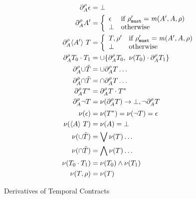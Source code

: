   {\begin{align*}
      \partial_{A}^{\rho}{\epsilon} &= \bot
      \\
      \partial_{A}^{\rho}{A'} &= \left\{
        \begin{array}{ll}
          \epsilon & \text{if } \rho'_{\tt must} = \mathit{m}(A', A, \rho) \\
          \bot & \text{otherwise}
        \end{array}\right.
      \\
      \partial_{A}^{\rho}{\langle A'\rangle\ T} &=
      \left\{\begin{array}{ll}
          T,\rho' & \text{if } \rho'_{\tt must} = \mathit{m}(A', A, \rho) \\
          \bot & \text{otherwise}
        \end{array}\right.
      \\
      \partial_{A}^{\rho}{T_0 \cdot T_1} &=
      \cup \{\partial_{A}^{\rho}{T_0},\
          \nu(T_0) \cdot \partial_{A}^{\rho}{T_1}\}
      \\
      \partial_{A}^{\rho}{\cup \tilde{T}} &=
      \cup \partial_{A}^{\rho}{T}\ldots
      \\
      \partial_{A}^{\rho}{\cap \tilde{T}} &=
      \cap \partial_{A}^{\rho}{T}\ldots
      \\
      \partial_{A}^{\rho}{T^*} &=
      \partial_{A}^{\rho}{T} \cdot T^*
      \\
      \partial_{A}^{\rho}{\neg T} &=
      \nu(\partial_{A}^{\rho}{T}) \to \bot,
      \neg \partial_{A}^{\rho}{T}
      \\[2pt]
      \nu(\epsilon) &= \nu(T^*) =
      \nu(\neg T) = \epsilon
      \\
      \nu(\langle A\rangle\ T) &= \nu(A) = \bot
      \\
      \nu(\cup \tilde{T}) &=
      \bigvee{\nu(T)\ldots}
      \\
      \nu(\cap \tilde{T}) &=
      \bigwedge{\nu(T)\ldots}
      \\
      \nu(T_0 \cdot T_1) &=
      \nu(T_0)\wedge \nu(T_1)
      \\
      \nu(T,\rho) &= \nu(T)
    \end{align*}}{\caption{Derivatives of Temporal Contracts}\label{fig:tcon-deriv}}

